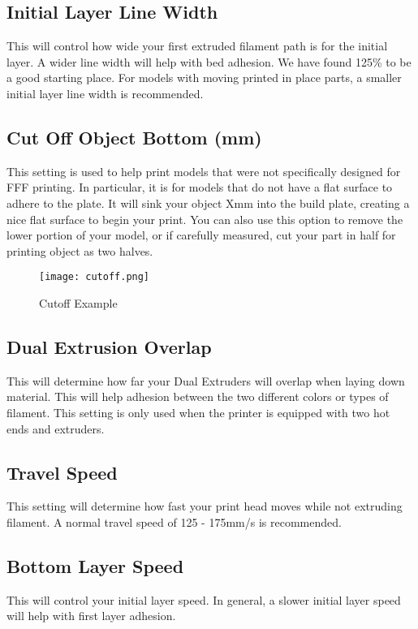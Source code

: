 \subsection{Initial Layer Line Width}
This will control how wide your first extruded filament path is for the initial layer. A wider line width will help with bed adhesion. We have found 125\% to be a good starting place. For models with moving printed in place parts, a smaller initial layer line width is recommended. %

\subsection{Cut Off Object Bottom (mm)}
This setting is used to help print models that were not specifically designed for FFF printing. In particular, it is for models that do not have a flat surface to adhere to the plate. It will sink your object Xmm into the build plate, creating a nice flat surface to begin your print. You can also use this option to remove the lower portion of your model, or if carefully measured, cut your part in half for printing object as two halves.
\begin{figure}[H]
\centering
\texttt{[image: cutoff.png]}
\caption{Cutoff Example}
\label{fig:Cutoff Example}
\end{figure}

\subsection{Dual Extrusion Overlap}
This will determine how far your Dual Extruders will overlap when laying down material. This will help adhesion between the two different colors or types of filament. This setting is only used when the printer is equipped with two hot ends and extruders.

\subsection{Travel Speed}
This setting will determine how fast your print head moves while not extruding filament. A normal travel speed of 125 - 175mm/s is recommended.

\subsection{Bottom Layer Speed}
This will control your initial layer speed. In general, a slower initial layer speed will help with first layer adhesion. 

